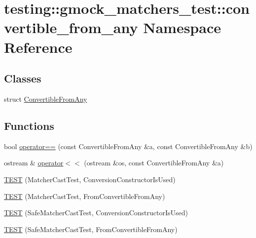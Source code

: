 \hypertarget{namespacetesting_1_1gmock__matchers__test_1_1convertible__from__any}{}\section{testing\+::gmock\+\_\+matchers\+\_\+test\+::convertible\+\_\+from\+\_\+any Namespace Reference}
\label{namespacetesting_1_1gmock__matchers__test_1_1convertible__from__any}
\subsection*{Classes}
\begin{DoxyCompactItemize}
\item 
struct \mbox{\hyperlink{structtesting_1_1gmock__matchers__test_1_1convertible__from__any_1_1_convertible_from_any}{Convertible\+From\+Any}}
\end{DoxyCompactItemize}
\subsection*{Functions}
\begin{DoxyCompactItemize}
\item 
bool \mbox{\hyperlink{namespacetesting_1_1gmock__matchers__test_1_1convertible__from__any_a11d27383932d6907ea215955a8dacc3b}{operator==}} (const Convertible\+From\+Any \&a, const Convertible\+From\+Any \&b)
\item 
ostream \& \mbox{\hyperlink{namespacetesting_1_1gmock__matchers__test_1_1convertible__from__any_a8bc42601c60dc9c5e42861c922d63e64}{operator$<$$<$}} (ostream \&os, const Convertible\+From\+Any \&a)
\item 
\mbox{\hyperlink{namespacetesting_1_1gmock__matchers__test_1_1convertible__from__any_af5ebdc7f68d7e1e48c6dacfaffd6f58a}{T\+E\+ST}} (Matcher\+Cast\+Test, Conversion\+Constructor\+Is\+Used)
\item 
\mbox{\hyperlink{namespacetesting_1_1gmock__matchers__test_1_1convertible__from__any_a72a4c336022bdea69ce15ba085f0e58e}{T\+E\+ST}} (Matcher\+Cast\+Test, From\+Convertible\+From\+Any)
\item 
\mbox{\hyperlink{namespacetesting_1_1gmock__matchers__test_1_1convertible__from__any_aca99c4625c546ea8390dcd2244626a43}{T\+E\+ST}} (Safe\+Matcher\+Cast\+Test, Conversion\+Constructor\+Is\+Used)
\item 
\mbox{\hyperlink{namespacetesting_1_1gmock__matchers__test_1_1convertible__from__any_a97a2ef4bbe1a2702e4bf79c12b1b9e9a}{T\+E\+ST}} (Safe\+Matcher\+Cast\+Test, From\+Convertible\+From\+Any)
\end{DoxyCompactItemize}


